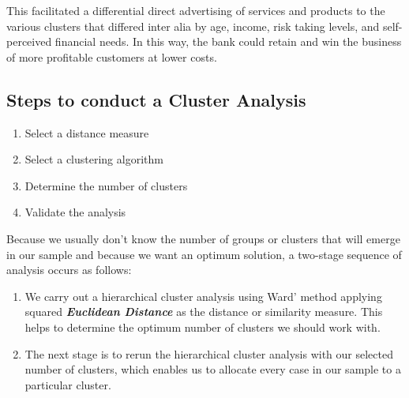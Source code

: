 \documentclass[a4paper,12pt]{article}
\begin{document}
This facilitated a differential direct advertising of services
and products to the various clusters that differed inter alia by age, income, risk taking levels, and self-perceived financial needs. In this way, the bank could retain and win the business of more profitable customers at lower costs.


\subsection{Steps to conduct a Cluster Analysis}
\begin{enumerate}
\item Select a distance measure
\item Select a clustering algorithm
\item Determine the number of clusters
\item Validate the analysis
\end{enumerate}
Because we usually don't know the number of groups or clusters that will emerge in our sample and because we want an optimum solution, a two-stage sequence of analysis occurs as follows:

\begin{enumerate}
\item We carry out a hierarchical cluster analysis using Ward' method applying squared
\textit{\textbf{Euclidean Distance}} as the distance or similarity measure. This helps to determine the
optimum number of clusters we should work with.
\item The next stage is to rerun the hierarchical cluster analysis with our selected number
of clusters, which enables us to allocate every case in our sample to a particular
cluster.
\end{enumerate}

\end{document}
